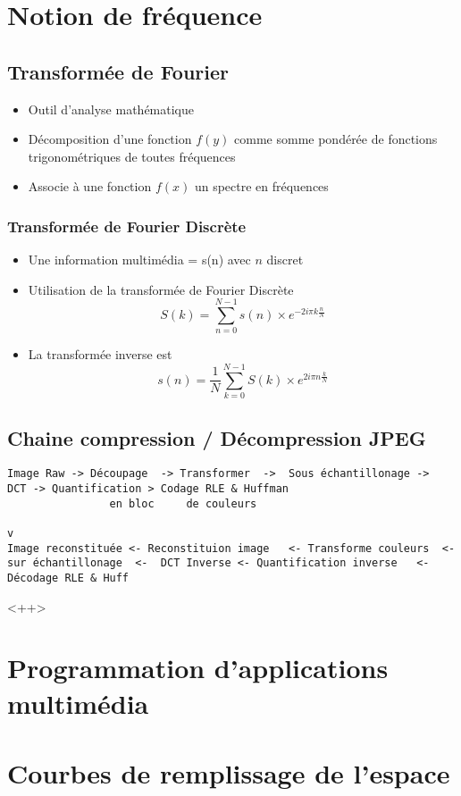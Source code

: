 \documentclass[12pt,a4paper,openany]{book}
\begin{document}
	\chapter{Notion de fréquence}
	\section{Transformée de Fourier}
\begin{itemize}
	\item Outil d'analyse mathématique
	\item Décomposition d'une fonction $f(y)$ comme somme pondérée de fonctions trigonométriques de toutes fréquences
	\item Associe à une fonction $f(x)$ un spectre en fréquences
\end{itemize}
\subsection{Transformée de Fourier Discrète}
\begin{itemize}
	\item Une information multimédia = s(n) avec $n$ discret
	\item Utilisation de la transformée de Fourier Discrète
		$$S(k) = \sum^{N-1}_{n=0}s(n) \times e^{-2i\pi k\frac{n}{N}}$$
	\item La transformée inverse est
		$$s(n) = \frac{1}{N}\sum^{N-1}_{k=0}S(k) \times e^{2i\pi n\frac{k}{N}}$$
\end{itemize}

\section{Chaine compression / Décompression JPEG}
\begin{verbatim}
Image Raw -> Découpage	-> Transformer  ->	Sous échantillonage	->	DCT	-> Quantification > Codage RLE & Huffman
				en bloc		de couleurs 
																																			v
Image reconstituée <- Reconstituion image	<- Transforme couleurs	<-	sur échantillonage	<-	DCT Inverse	<- Quantification inverse	<-	Décodage RLE & Huff
\end{verbatim}<++>
	\chapter{Programmation d'applications multimédia}
	\chapter{Courbes de remplissage de l'espace}
\end{document}
